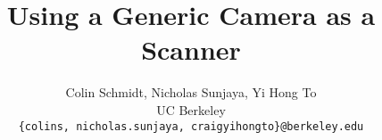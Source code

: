 \documentclass[10pt,twocolumn,letterpaper]{article}
\begin{document}
\title{Using a Generic Camera as a Scanner}

\author{
Colin Schmidt, Nicholas Sunjaya, Yi Hong To\\
UC Berkeley\\
{\tt\small \{colins, nicholas.sunjaya, craigyihongto\}@berkeley.edu}
}

\maketitle











{\small


}
\end{document}
